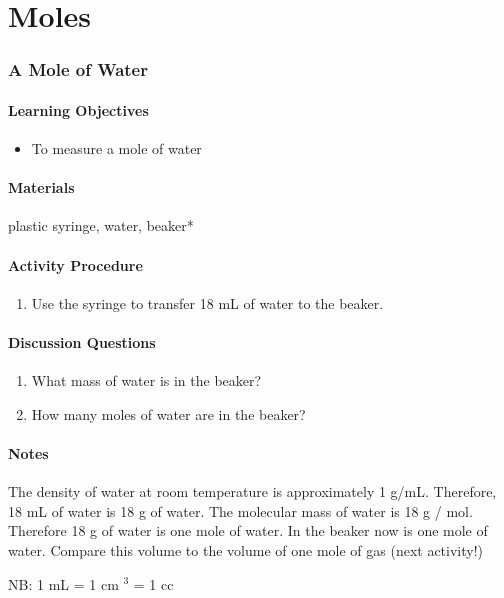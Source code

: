 \chapter{Moles}

\subsection{A Mole of Water}

\subsubsection*{Learning Objectives}
\begin{itemize}
\item{To measure a mole of water}
\end{itemize}

\subsubsection*{Materials}
plastic syringe, water, beaker*

\subsubsection*{Activity Procedure}
\begin{enumerate}
\item{Use the syringe to transfer 18 mL of water to the beaker.}
\end{enumerate}

\subsubsection*{Discussion Questions}
\begin{enumerate}
\item{What mass of water is in the beaker?}
\item{How many moles of water are in the beaker?}
\end{enumerate}

\subsubsection*{Notes}
The density of water at room temperature is approximately 1 g/mL. Therefore, 18 mL of water is 18 g of water. The molecular mass of water is 18 g / mol. Therefore 18 g of water is one mole of water. In the beaker now is one mole of water. Compare this volume to the volume of one mole of gas (next activity!)
\begin{center}
NB: 1 mL = 1 cm $^{3}$ = 1 cc
\end{center}

